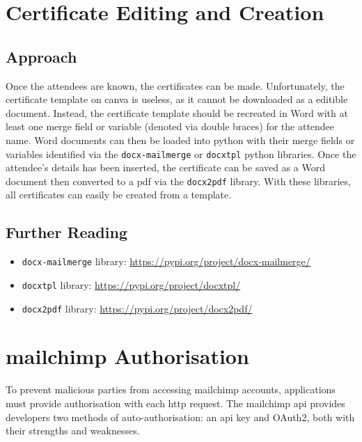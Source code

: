 \documentclass[11pt]{article}
\begin{document}
\newpage

\section{Certificate Editing and Creation}

\subsection{Approach}

Once the attendees are known, the certificates can be made. Unfortunately, the certificate template on \Gls{canva} is useless, as it cannot be downloaded as a editible document. Instead, the certificate template should be recreated in Word with at least one merge field or variable (denoted via double braces) for the attendee name. Word documents can then be loaded into \Gls{python} with their merge fields or variables identified via the \texttt{docx-mailmerge} or \texttt{docxtpl} \Gls{python} libraries. Once the attendee's details has been inserted, the certificate can be saved as a Word document then converted to a \acrshort{pdf} via the \texttt{docx2pdf} \gls{library}. With these libraries, all certificates can easily be created from a template.

\subsection{Further Reading}

\begin{itemize}
    \item \texttt{docx-mailmerge} \gls{library}: \url{https://pypi.org/project/docx-mailmerge/}
    \item \texttt{docxtpl} \gls{library}: \url{https://pypi.org/project/docxtpl/}
    \item \texttt{docx2pdf} \gls{library}: \url{https://pypi.org/project/docx2pdf/}
\end{itemize}

\newpage

\section{\Gls{mailchimp} Authorisation}

To prevent malicious parties from accessing \Gls{mailchimp} accounts, applications must provide authorisation with each \acrshort{http} \gls{request}. The \Gls{mailchimp} \acrshort{api} provides developers two methods of auto-authorisation: an \acrshort{api} key and OAuth2, both with their strengths and weaknesses.
\end{document}
